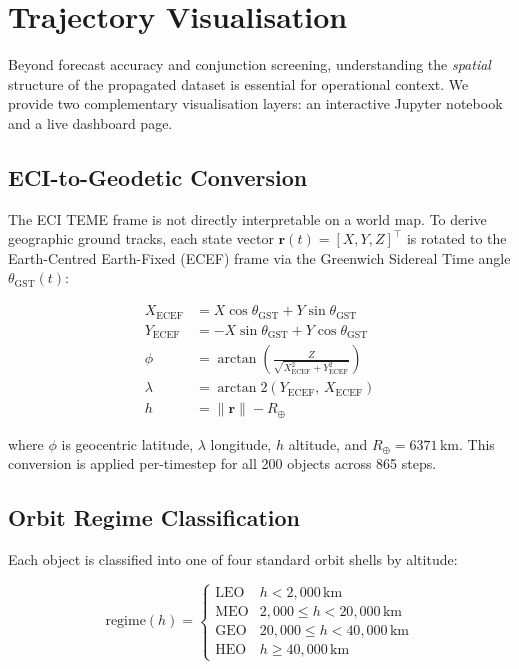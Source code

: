 \documentclass[conference]{IEEEtran}
\begin{document}
\section{Trajectory Visualisation}
\label{sec:trajectory}

Beyond forecast accuracy and conjunction screening, understanding the
\emph{spatial} structure of the propagated dataset is essential for
operational context. We provide two complementary visualisation layers:
an interactive Jupyter notebook and a live dashboard page.

\subsection{ECI-to-Geodetic Conversion}

The ECI TEME frame is not directly interpretable on a world map. To derive
geographic ground tracks, each state vector $\mathbf{r}(t) = [X,Y,Z]^\top$
is rotated to the Earth-Centred Earth-Fixed (ECEF) frame via the Greenwich
Sidereal Time angle $\theta_\text{GST}(t)$:

\begin{align}
X_\text{ECEF} &= X\cos\theta_\text{GST} + Y\sin\theta_\text{GST} \\
Y_\text{ECEF} &= -X\sin\theta_\text{GST} + Y\cos\theta_\text{GST} \\
\phi &= \arctan\!\left(\frac{Z}{\sqrt{X_\text{ECEF}^2 + Y_\text{ECEF}^2}}\right) \\
\lambda &= \arctan2(Y_\text{ECEF},\, X_\text{ECEF}) \\
h &= \|\mathbf{r}\| - R_\oplus
\label{eq:eci_geodetic}
\end{align}

where $\phi$ is geocentric latitude, $\lambda$ longitude, $h$ altitude, and
$R_\oplus = 6371$\,km. This conversion is applied per-timestep for all 200
objects across 865 steps.

\subsection{Orbit Regime Classification}

Each object is classified into one of four standard orbit shells by altitude:

\begin{equation}
\text{regime}(h) =
\begin{cases}
\text{LEO} & h < 2{,}000\,\text{km} \\
\text{MEO} & 2{,}000 \leq h < 20{,}000\,\text{km} \\
\text{GEO} & 20{,}000 \leq h < 40{,}000\,\text{km} \\
\text{HEO} & h \geq 40{,}000\,\text{km}
\end{cases}
\label{eq:regime_class}
\end{equation}
\end{document}
